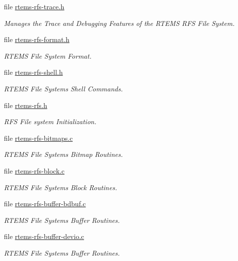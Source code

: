 \begin{DoxyCompactItemize}
file \mbox{\hyperlink{rtems-rfs-trace_8h}{rtems-\/rfs-\/trace.\+h}}
\begin{DoxyCompactList}\small\item\em Manages the Trace and Debugging Features of the R\+T\+E\+MS R\+FS File System. \end{DoxyCompactList}\item 
file \mbox{\hyperlink{rtems-rfs-format_8h}{rtems-\/rfs-\/format.\+h}}
\begin{DoxyCompactList}\small\item\em R\+T\+E\+MS File System Format. \end{DoxyCompactList}\item 
file \mbox{\hyperlink{rtems-rfs-shell_8h}{rtems-\/rfs-\/shell.\+h}}
\begin{DoxyCompactList}\small\item\em R\+T\+E\+MS File Systems Shell Commands. \end{DoxyCompactList}\item 
file \mbox{\hyperlink{rtems-rfs_8h}{rtems-\/rfs.\+h}}
\begin{DoxyCompactList}\small\item\em R\+FS File system Initialization. \end{DoxyCompactList}\item 
file \mbox{\hyperlink{rtems-rfs-bitmaps_8c}{rtems-\/rfs-\/bitmaps.\+c}}
\begin{DoxyCompactList}\small\item\em R\+T\+E\+MS File Systems Bitmap Routines. \end{DoxyCompactList}\item 
file \mbox{\hyperlink{rtems-rfs-block_8c}{rtems-\/rfs-\/block.\+c}}
\begin{DoxyCompactList}\small\item\em R\+T\+E\+MS File Systems Block Routines. \end{DoxyCompactList}\item 
file \mbox{\hyperlink{rtems-rfs-buffer-bdbuf_8c}{rtems-\/rfs-\/buffer-\/bdbuf.\+c}}
\begin{DoxyCompactList}\small\item\em R\+T\+E\+MS File Systems Buffer Routines. \end{DoxyCompactList}\item 
file \mbox{\hyperlink{rtems-rfs-buffer-devio_8c}{rtems-\/rfs-\/buffer-\/devio.\+c}}
\begin{DoxyCompactList}\small\item\em R\+T\+E\+MS File Systems Buffer Routines. \end{DoxyCompactList}\item 

\end{DoxyCompactItemize}
